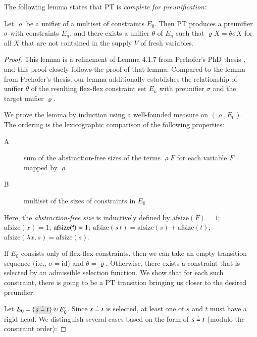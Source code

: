The following lemma states that PT is \emph{complete for preunification}:
\begin{lemma}
  \label{unif:lemma:pt-complete}
  Let $\varrho$ be a unifier of a multiset of constraints $E_0$. Then PT produces a
  preunifier $\sigma$ with constraints $E_n$, and there exists a
  unifier $\theta$ of $E_n$ such that
  $\varrho X = \theta \sigma X$ for all $X$ that are not contained in the supply $V$ of fresh variables.
\end{lemma}
\begin{proof}
  This lemma is a refinement of Lemma 4.1.7 from Prehofer's PhD thesis
  \cite{cp-95-unifphd}, and this proof closely follows the proof of that lemma.
  Compared to the lemma from Prehofer's thesis, our lemma additionally establishes
  the relationship of unifier $\theta$ of the resulting flex-flex constraint
  set $E_n$ with preunifier $\sigma$ and the target unifier $\varrho$.

  We prove the lemma by induction 
  using a well-founded measure on $(\varrho,
  E_0)$. The ordering
  is the lexicographic comparison of the following properties:

  \begin{description}
    \item[A] sum of the abstraction-free sizes of the terms $\varrho F$ for each variable $F$ mapped by $\varrho$
    \item[B] multiset of the sizes of constraints in $E_0$
  \end{description}
Here, the \emph{abstraction-free size} is inductively defined by
$\text{afsize}(F) = 1$; $\text{afsize}(x) = 1$; $\text{afsize}(\mathsf{f}) = 1$;
$\text{afsize}(s\,t) = \text{afsize}(s) + \text{afsize}(t)$;
$\text{afsize}(\lambda x.\, s) = \text{afsize}(s)$.

  If $E_0$ consists only of flex-flex constraints, then we can take an empty
  transition sequence (i.e., $\sigma = \text{id}$) and $\theta = \varrho$.
  Otherwise, there exists a constraint that is selected by an
  admissible selection function. We show that for each such constraint, there is
  going to be a PT transition bringing us closer to the desired preunifier.

  Let $E_0 = \{\selected{s \unif t}\} \uplus E'_0$. Since $s \unif t$ is selected, at least
  one of $s$ and $t$ must have a rigid head. We distinguish several cases based on the
  form of $s \unif t$ (modulo the constraint order):
  

\end{proof}
